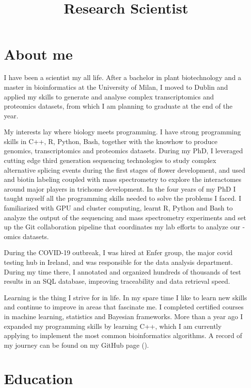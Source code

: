 \documentclass{moderncv}
\title{Research Scientist}
\begin{document}
\maketitle
\section{About me}
I have been a scientist my all life. After a bachelor in plant biotechnology
and a master in bioinformatics at the University of Milan, I moved to Dublin
and applied my skills to generate and analyse complex transcriptomics and
proteomics datasets, from which I am planning to graduate at the end of the
year.

My interests lay where biology meets programming. I have strong programming
skills in C++, R, Python, Bash, together with the knowhow to produce genomics,
transcriptomics and proteomics datasets. During my PhD, I leveraged cutting
edge third generation sequencing technologies to study complex alternative
splicing events during the first stages of flower development, and used and
biotin labeling coupled with mass spectrometry to explore the interactomes
around major players in trichome development. In the four years of my PhD I
taught myself all the programming skills needed to solve the problems I faced.
I familiarized with GPU and cluster computing, learnt R, Python and Bash to
analyze the output of the sequencing and mass spectrometry experiments and set
up the Git collaboration pipeline that coordinates my lab efforts to analyze
our -omics datasets.

During the COVID-19 outbreak, I was hired at Enfer group, the major covid
testing hub in Ireland, and was responsible for the data analysis department.
During my time there, I annotated and organized hundreds of thousands of test
results in an SQL database, improving traceability and data retrieval speed.

Learning is the thing I strive for in life. In my spare time I like to learn
new skills and continue to improve in areas that fascinate me. I completed
certified courses in machine learning, statistics and Bayesian frameworks.
More than a year ago I expanded my programming skills by learning C++, which I
am currently applying to implement the most common bioinformatics algorithms.
A record of my journey can be found on my GitHub page
().
%
\closesection{}
\pagebreak
%
\section{Education}
\end{document}

